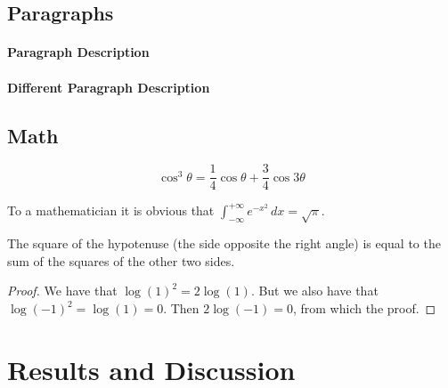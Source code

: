 \documentclass[
12pt, %
a4paper, %
oneside, %
headinclude,footinclude, %
BCOR5mm, %
german]{scrartcl}
\begin{document}
\subsection{Paragraphs}

\lipsum[6] %

\paragraph{Paragraph Description} \lipsum[7] %

\paragraph{Different Paragraph Description} \lipsum[8] %


\subsection{Math}

\lipsum[4] %

\begin{equation}
\cos^3 \theta =\frac{1}{4}\cos\theta+\frac{3}{4}\cos 3\theta
\label{eq:refname2}
\end{equation}

\lipsum[5] %

\begin{definition}[Gauss] 
To a mathematician it is obvious that
$\int_{-\infty}^{+\infty}
e^{-x^2}\,dx=\sqrt{\pi}$. 
\end{definition} 

\begin{theorem}[Pythagoras]
The square of the hypotenuse (the side opposite the right angle) is equal to the sum of the squares of the other two sides.
\end{theorem}

\begin{proof} 
We have that $\log(1)^2 = 2\log(1)$.
But we also have that $\log(-1)^2=\log(1)=0$.
Then $2\log(-1)=0$, from which the proof.
\end{proof}


\section{Results and Discussion}
\end{document}
